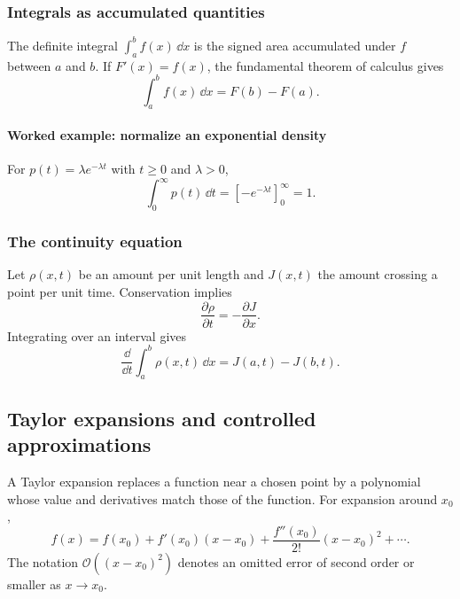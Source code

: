 \subsubsection{Integrals as accumulated quantities}

The definite integral $\int_a^b f(x)\,\dd x$ is the signed area accumulated under $f$ between $a$ and $b$.
If $F'(x)=f(x)$, the fundamental theorem of calculus gives
\[
    \int_a^b f(x)\,\dd x=F(b)-F(a).
\]

\paragraph{Worked example: normalize an exponential density}
For $p(t)=\lambda e^{-\lambda t}$ with $t\geq0$ and $\lambda>0$,
\[
    \int_0^{\infty}p(t)\,\dd t=\left[-e^{-\lambda t}\right]_{0}^{\infty}=1.
\]

\subsubsection{The continuity equation}

Let $\rho(x,t)$ be an amount per unit length and $J(x,t)$ the amount crossing a point per unit time.
Conservation implies
\[
    \frac{\partial\rho}{\partial t}=-\frac{\partial J}{\partial x}.
\]
Integrating over an interval gives
\[
    \frac{\dd}{\dd t}\int_a^b\rho(x,t)\,\dd x=J(a,t)-J(b,t).
\]


\subsection{Taylor expansions and controlled approximations}
\label{math:taylor}

A Taylor expansion replaces a function near a chosen point by a polynomial whose value and derivatives match those of the function.
For expansion around $x_0$,
\[
    f(x)=f(x_0)+f'(x_0)(x-x_0)+\frac{f''(x_0)}{2!}(x-x_0)^2+\cdots.
\]
The notation $\mathcal{O}((x-x_0)^2)$ denotes an omitted error of second order or smaller as $x\rightarrow x_0$.

